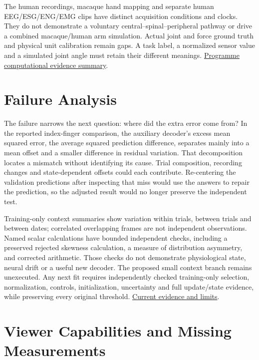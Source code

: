 The human recordings, macaque hand mapping and separate human EEG/ESG/ENG/EMG clips have distinct acquisition conditions and clocks. They do not demonstrate a voluntary central--spinal--peripheral pathway or drive a combined macaque/human arm simulation. Actual joint and force ground truth and physical unit calibration remain gaps. A task label, a normalized sensor value and a simulated joint angle must retain their different meanings. \href{research-evidence.json}{Programme computational evidence summary}.\par

\section{Failure Analysis}

The failure narrows the next question: where did the extra error come from? In the reported index-finger comparison, the auxiliary decoder's excess mean squared error, the average squared prediction difference, separates mainly into a mean offset and a smaller difference in residual variation. That decomposition locates a mismatch without identifying its cause. Trial composition, recording changes and state-dependent offsets could each contribute. Re-centering the validation predictions after inspecting that miss would use the answers to repair the prediction, so the adjusted result would no longer preserve the independent test.\par

Training-only context summaries show variation within trials, between trials and between dates; correlated overlapping frames are not independent observations. Named scalar calculations have bounded independent checks, including a preserved rejected skewness calculation, a measure of distribution asymmetry, and corrected arithmetic. Those checks do not demonstrate physiological state, neural drift or a useful new decoder. The proposed small context branch remains unexecuted. Any next fit requires independently checked training-only selection, normalization, controls, initialization, uncertainty and full update/state evidence, while preserving every original threshold. \href{research-evidence.json}{Current evidence and limits}.\par



\section{Viewer Capabilities and Missing Measurements}

